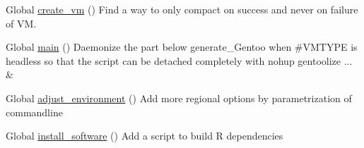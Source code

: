 
\begin{DoxyRefList}
\item[Global \mbox{\hyperlink{group__create_installer_ga629c1830d8dbae377193387edd199399}{create\+\_\+vm}} ()]\label{todo__todo000001}%
%
Find a way to only compact on success and never on failure of VM.  
\item[Global \mbox{\hyperlink{group__create_installer_ga51af30a60f9f02777c6396b8247e356f}{main}} ()]\label{todo__todo000002}%
%
Daemonize the part below generate\+\_\+\+Gentoo when \#\+V\+M\+T\+Y\+PE is {\ttfamily headless} so that the script can be detached completely with {\ttfamily nohup gentoolize ... \&}  
\item[Global \mbox{\hyperlink{group__mk_file_system_gaa8c398850ee5921a441408b92f32d477}{adjust\+\_\+environment}} ()]\label{todo__todo000003}%
%
Add more regional options by parametrization of commandline  
\item[Global \mbox{\hyperlink{group__mk_file_system_gab693423f511d21225dbc60b2782190c3}{install\+\_\+software}} ()]\label{todo__todo000004}%
%
Add a script to build R dependencies 
\end{DoxyRefList}